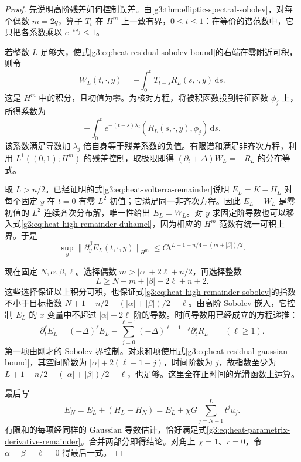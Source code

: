 \begin{proof}
	先说明高阶残差如何控制误差。由\cref{g3:thm:elliptic-spectral-sobolev}，对每个偶数 \(m=2q\)，算子 \(T_t\) 在 \(H^m\) 上一致有界，\(0\le t\le1\)：在等价的谱范数中，它只把各系数乘以 \(e^{-t\lambda_j}\le1\)。

	若整数 \(L\) 足够大，使式\eqref{g3:eq:heat-residual-sobolev-bound}的右端在零附近可积，则令
	\begin{equation}\label{g3:eq:heat-high-remainder-duhamel}
		W_L(t,\cdot,y)=-\int_0^tT_{t-s}R_L(s,\cdot,y)\,\mathrm ds.
	\end{equation}
	这是 \(H^m\) 中的积分，且初值为零。为核对方程，将被积函数投到特征函数 \(\phi_j\) 上，所得系数为
	\[
		-\int_0^te^{-(t-s)\lambda_j}
		(R_L(s,\cdot,y),\phi_j)\,\mathrm ds.
	\]
	该系数满足导数加 \(\lambda_j\) 倍自身等于残差系数的负值。有限谱和满足非齐次方程，利用 \(L^1((0,1);H^m)\) 的残差控制，取极限即得 \((\partial_t+\Delta)W_L=-R_L\) 的分布等式。

	取 \(L>n/2\)。已经证明的式\eqref{g3:eq:heat-volterra-remainder}说明 \(E_L=K-H_L\) 对每个固定 \(y\) 在 \(t=0\) 有零 \(L^2\) 初值；它满足同一非齐次方程。因此 \(E_L-W_L\) 是零初值的 \(L^2\) 连续齐次分布解，唯一性给出 \(E_L=W_L\)。对 \(y\) 求固定阶导数也可以移入式\eqref{g3:eq:heat-high-remainder-duhamel}，因为相应的 \(H^m\) 范数有统一可积上界。于是
	\begin{equation}\label{g3:eq:heat-high-remainder-sobolev}
		\sup_y\|\partial_y^\beta E_L(t,\cdot,y)\|_{H^m}
		\le Ct^{L+1-n/4-(m+|\beta|)/2}.
	\end{equation}

	现在固定 \(N,\alpha,\beta,\ell\)。选择偶数 \(m>|\alpha|+2\ell+n/2\)，再选择整数
	\[
		L\ge N+m+|\beta|+2\ell+n+2.
	\]
	这些选择保证以上积分可积，也保证式\eqref{g3:eq:heat-high-remainder-sobolev}的指数不小于目标指数
	\(N+1-n/2-(|\alpha|+|\beta|)/2-\ell\)。由高阶 Sobolev 嵌入，它控制 \(E_L\) 的 \(x\) 变量中不超过 \(|\alpha|+2\ell\) 阶的导数。时间导数用已经成立的方程递推：
	\[
		\partial_t^\ell E_L=(-\Delta)^\ell E_L
		-\sum_{j=0}^{\ell-1}(-\Delta)^{\ell-1-j}\partial_t^jR_L
		\qquad(\ell\ge1).
	\]
	第一项由刚才的 Sobolev 界控制。对求和项使用式\eqref{g3:eq:heat-residual-gaussian-bound}，其空间阶数为 \(|\alpha|+2(\ell-1-j)\)，时间阶数为 \(j\)，故指数至少为
	\(L+1-n/2-(|\alpha|+|\beta|)/2-\ell\)，也足够。这里全在正时间的光滑函数上运算。

	最后写
	\[
		E_N=E_L+(H_L-H_N)
		=E_L+\chi G\sum_{j=N+1}^Lt^ju_j.
	\]
	有限和的每项经同样的 Gaussian 导数估计，恰好满足式\eqref{g3:eq:heat-parametrix-derivative-remainder}。合并两部分即得结论。对角上 \(\chi=1\)、\(r=0\)，令 \(\alpha=\beta=\ell=0\) 得最后一式。
\end{proof}

